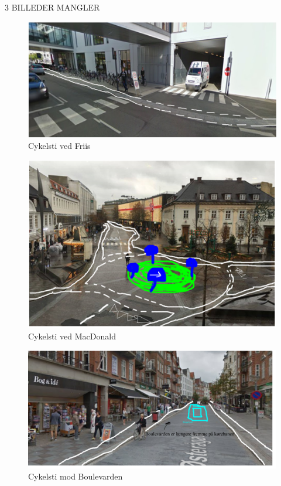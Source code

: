 3 BILLEDER MANGLER
\begin{figure}[htbp]
  \centering
  \begin{adjustbox}{max width=\textwidth}
    \includegraphics{figures/Billederogfigur/friiscykeltsti.png}
 \end{adjustbox}
  \caption{Cykelsti ved Friis}
   \label{fig:cykelsti_friis}
\end{figure}

\begin{figure}[htbp]
  \centering
  \begin{adjustbox}{max width=\textwidth}
    \includegraphics{figures/Billederogfigur/cykelsti_ved_mac.png}
 \end{adjustbox}
  \caption{Cykelsti ved MacDonald}
   \label{fig:cykelsti_mac}
\end{figure}
\begin{figure}[htbp]
  \centering
  \begin{adjustbox}{max width=\textwidth}
    \includegraphics{figures/Billederogfigur/bogogide.png}
 \end{adjustbox}
  \caption{Cykelsti mod Boulevarden}
   \label{fig:cykelsti_boulevarden}
\end{figure}





